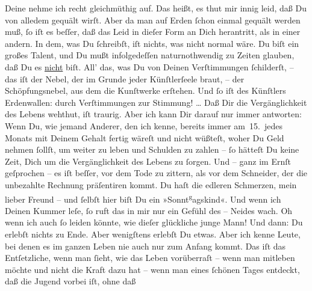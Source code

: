 \pstart
           Deine \label{K_L02765-7v}\label{K_L02765-7} nehme ich recht gleichmüthig auf. Das heißt, es thut mir innig leid, daß Du
               von alledem gequält wirſt. Aber da man auf  Erden{ }ſchon einmal gequält werden muß,{ }ſo iſt es beſſer, daß das Leid
               in dieſer Form an Dich herantritt, als in einer andern. In dem, was Du{ }ſchreibſt, iſt nichts, was nicht normal wäre. Du biſt ein großes Talent, und Du mußt
               infolgedeſſen naturnothwendig zu Zeiten glauben, daß Du es \uline{nicht} biſt. All’ das, was Du von Deinen Verſtimmungen{ }ſchilderſt, – das iſt
               der  Nebel, der im Grunde jeder Künſtlerſeele
               braut,  – der Schöpfungsnebel, aus dem die
               Kunſtwerke erſtehen. Und{ }ſo iſt des Künſtlers Erdenwallen: durch Verſtimmungen zur
               Stimmung! {\dots} Daß Dir {\pb}die
               Vergänglichkeit des Lebens wehthut, iſt traurig. Aber ich kann Dir darauf nur immer
               antworten: Wenn Du, wie jemand Anderer, den ich kenne, bereits immer am 15. jedes
               Monats mit Deinem Gehalt fertig wäreſt und nicht wüßteſt, woher Du Geld nehmen{ }ſollſt, um weiter zu leben und Schulden zu zahlen –{ }ſo hätteſt Du keine Zeit, Dich um
               die Vergänglichkeit des Lebens zu{ }ſorgen. Und – ganz im Ernſt geſprochen – es iſt
               beſſer, vor dem Tode zu zittern, als vor {\pb}dem
               Schneider, der die unbezahlte Rechnung präſentiren kommt. Du haſt die edleren
               Schmerzen, mein lieber Freund – und{ }ſelbſt hier biſt Du ein »Sonnt\substVorne{}\textsuperscript{g}\substDazwischen{}a\substHinten{}gskind«. Und wenn ich Deinen Kummer leſe,{ }ſo ruft das in mir nur ein Gefühl
               des – Neides wach. Oh wenn ich auch{ }ſo  leiden
               könnte, wie dieſer glückliche junge Mann! Und dann: Du erlebſt nichts zu Ende. Aber
               wenigſtens erlebſt Du etwas. Aber ich kenne {\pb}Leute,
               bei  denen es im ganzen Leben nie auch nur zum
               Anfang kommt. Das iſt das Entſetzliche, wenn man{ }ſieht, wie das Leben vorüberraſt –
               wenn man mitleben möchte und nicht die Kraft dazu hat – wenn man eines{ }ſchönen Tages
                   entdeckt, daß die Jugend vorbei iſt, ohne daß
